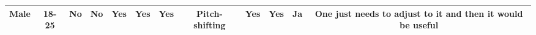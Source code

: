 \begin{table}[]
\begin{tabular}{|c|c|c|c|c|c|c|c|c|c|c|c|}
Male    & 18-25 & No           & No                                                  & Yes                                 & Yes                                            & Yes                       & Pitch-shifting               & Yes                                                   & Yes                                     & Ja                                           & One just needs to adjust to it and then it would be useful                                                          \\ \hline
\end{tabular}
\end{table}